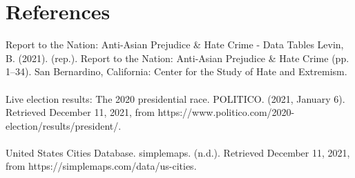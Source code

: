 \documentclass[fontsize=11pt]{article}
\begin{document}
\section*{References}


Report to the Nation: Anti-Asian Prejudice & Hate Crime - Data Tables Levin, B. (2021). (rep.). Report to
the Nation: Anti-Asian Prejudice & Hate Crime (pp. 1–34). San Bernardino, California: Center for the Study of
Hate and Extremism.
\\\\
Live election results: The 2020 presidential race. POLITICO. (2021, January 6). Retrieved December 11, 2021, from https://www.politico.com/2020-election/results/president/.
\\\\
United States Cities Database. simplemaps. (n.d.). Retrieved December 11, 2021, from https://simplemaps.com/data/us-cities.

\end{document}
